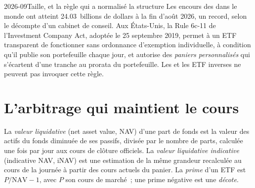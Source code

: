 \begin{dated}{2026-09}{Taille, et la règle qui a normalisé la structure}\label{dat:m1:exchange-traded-funds:size}
Les encours des  dans le monde ont atteint 24.03~billions de dollars à la fin
d'août 2026, un record, selon le décompte d'un cabinet de conseil. Aux États-Unis, la
Rule 6c-11 de l'Investment Company Act, adoptée le 25 septembre 2019, permet à un ETF
transparent de fonctionner sans ordonnance d'exemption individuelle, à condition qu'il publie
son portefeuille chaque jour, et autorise des \emph{paniers personnalisés} qui s'écartent
d'une tranche au prorata du portefeuille. Les  et les ETF inverses ne peuvent pas invoquer cette règle.
\end{dated}

\section{L'arbitrage qui maintient le cours}

\begin{definition}\label{def:m1:exchange-traded-funds:nav}
La \emph{valeur liquidative} (net asset value, NAV) d'une part de fonds est
la valeur des actifs du fonds diminuée de ses passifs, divisée par le nombre
de parts, calculée une fois par jour aux cours de clôture officiels. La
\emph{valeur liquidative indicative} (indicative NAV, iNAV) est une estimation de la même
grandeur recalculée au cours de la journée à partir des cours actuels du panier. La
\emph{prime} d'un ETF est $P/\mathrm{NAV} - 1$, avec $P$ son
cours de marché~; une prime négative est une \emph{décote}.
\end{definition}

